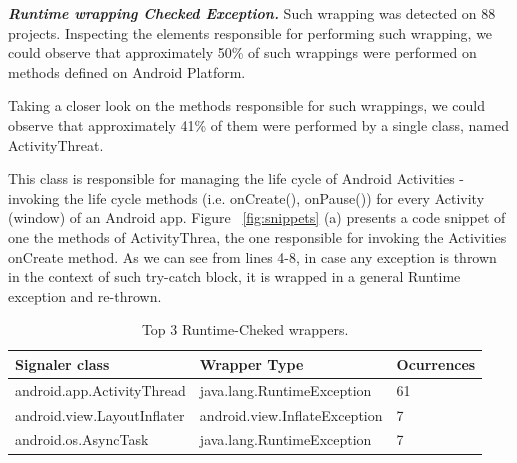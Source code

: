 \documentclass[conference]{IEEEtran}
\begin{document}
\emph{\textbf{Runtime wrapping Checked Exception.}} Such wrapping was 
detected on 88 projects. Inspecting the 
elements responsible for performing such wrapping, we could observe that
approximately  50\% of such wrappings were performed on methods defined on Android
Platform. 

Taking a closer look on the methods responsible for such wrappings,
 we could observe that approximately 41\% of them were performed by a single class,
 named ActivityThreat. 

This class is responsible for managing the life cycle of  Android Activities - 
invoking the life cycle methods (i.e. onCreate(), onPause()) for every Activity 
(window) of an Android app.
Figure ~\ref{fig:snippets} (a) presents a code snippet of one the methods of 
ActivityThrea,  the one responsible for invoking the Activities onCreate method. 
As we can see from lines 4-8,
 in case any exception is thrown in the context of such try-catch block, 
it is wrapped in a general Runtime exception and re-thrown.

\begin{table}
\centering
\begin{tabular}{lll}
    \hline
 \bfseries{Signaler class} &  \bfseries{Wrapper Type} & \bfseries{Ocurrences} \\
    \hline
android.app.ActivityThread & java.lang.RuntimeException & 61\\
android.view.LayoutInflater & android.view.InflateException &  7 \\
android.os.AsyncTask & java.lang.RuntimeException &  7\\
\hline
  \end{tabular}
\caption{Top 3 Runtime-Cheked wrappers.}
\label{tab:wrapping01}
\end{table}




\end{document}

